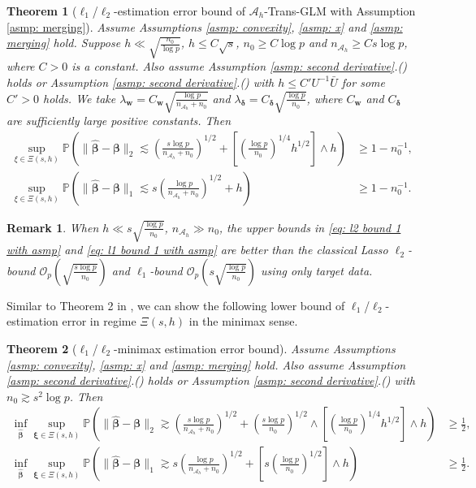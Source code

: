 \documentclass[12pt]{article}
\newcommand*{\rom}[1]{\romannumeral #1}
\newcommand{\tp}{\mathbb{P}}
\newcommand{\bxi}{\bm{\xi}}
\newcommand{\bdelta}{\bm{\delta}}
\newcommand{\twonorm}[1]{\|#1\|_{2}}
\newcommand{\onenorm}[1]{\|#1\|_{1}}
\newcommand{\bbeta}{\bm{\beta}}
\newcommand{\hbeta}{\hat{\bm{\beta}}}
\newcommand{\bw}{\bm{w}}
\newcommand{\mah}{\mathcal{A}_h}
\newcommand{\nah}{n_{\mathcal{A}_h}}
\newcommand{\<}{\langle}
\renewcommand{\>}{\rangle}
\newtheorem{theorem}{Theorem}
\newtheorem{remark}{Remark}
\begin{document}
\begin{theorem}[$\ell_1$/$\ell_2$-estimation error bound of $\mah$-Trans-GLM with Assumption \ref{asmp: merging}]\label{thm: l2 with assumption}
	Assume Assumptions \ref{asmp: convexity}, \ref{asmp: x} and \ref{asmp: merging} hold.  Suppose $h \ll \sqrt{\frac{n_0}{\log p}}$, $h \leq C\sqrt{s}$, $n_0 \geq C\log p$ and $\nah \geq Cs\log p$, where $C>0$ is a constant. Also assume Assumption \ref{asmp: second derivative}.(\rom{1}) holds or Assumption \ref{asmp: second derivative}.(\rom{2}) with $h \leq C'U^{-1}\bar{U}$ for some $C' > 0$ holds. We take $\lambda_{\bm{w}} = C_{\bw}\sqrt{\frac{\log p}{\nah+n_0}}$ and $\lambda_{\bdelta} = C_{\bdelta}\sqrt{\frac{\log p}{n_0}}$, where $C_{\bw}$ and $C_{\bdelta}$ are sufficiently large positive constants.  Then
	\begin{align}
		\sup_{\xi \in \Xi(s, h)}\tp\left(\twonorm{\hbeta - \bbeta} \lesssim \left(\frac{s\log p}{\nah+n_0}\right)^{1/2} +  \left[\left(\frac{\log p}{n_0}\right)^{1/4}h^{1/2}\right]\wedge h  \right)&\geq 1-n_0^{-1}, \label{eq: l2 bound 1 with asmp}\\
		\sup_{\xi \in \Xi(s, h)}\tp\left(\onenorm{\hbeta - \bbeta} \lesssim s\left(\frac{\log p}{\nah+n_0}\right)^{1/2} + h\right)&\geq 1-n_0^{-1}.\label{eq: l1 bound 1 with asmp}
	\end{align}
\end{theorem}

\begin{remark}
	When $h \ll s\sqrt{\frac{\log p}{n_0}}$, $\nah \gg n_0$, the upper bounds in \eqref{eq: l2 bound 1 with asmp} and \eqref{eq: l1 bound 1 with asmp} are better than the classical Lasso $\ell_2$-bound $\mathcal{O}_p\left(\sqrt{\frac{s\log p}{n_0}}\right)$ and $\ell_1$-bound $\mathcal{O}_p\left(s\sqrt{\frac{\log p}{n_0}}\right)$ using only target data.
\end{remark}

Similar to Theorem 2 in \cite{li2021transfer}, we can show the following lower bound of $\ell_1$/$\ell_2$-estimation error in regime $\Xi(s, h)$ in the minimax sense.

\begin{theorem}[$\ell_1$/$\ell_2$-minimax estimation error bound]\label{thm: minimax}
Assume Assumptions \ref{asmp: convexity}, \ref{asmp: x} and \ref{asmp: merging} hold. Also assume Assumption \ref{asmp: second derivative}.(\rom{1}) holds or Assumption \ref{asmp: second derivative}.(\rom{2}) with $n_0 \gtrsim s^2\log p$. Then
\begin{align}
	\inf_{\hat{\bbeta}}\sup_{\bxi \in \Xi(s, h)}\tp\left(\twonorm{\hbeta - \bbeta} \gtrsim \left(\frac{s\log p}{\nah+n_0}\right)^{1/2} + \left(\frac{s\log p}{n_0}\right)^{1/2} \wedge \left[\left(\frac{\log p}{n_0}\right)^{1/4}h^{1/2}\right]\wedge h\right)&\geq \frac{1}{2}, \\
	\inf_{\hat{\bbeta}}\sup_{\bxi \in \Xi(s, h)}\tp\left(\onenorm{\hbeta - \bbeta} \gtrsim s\left(\frac{\log p}{\nah+n_0}\right)^{1/2} + \left[s\left(\frac{\log p}{n_0}\right)^{1/2}\right] \wedge h\right)&\geq \frac{1}{2}.
\end{align}
\end{theorem}
\end{document}
